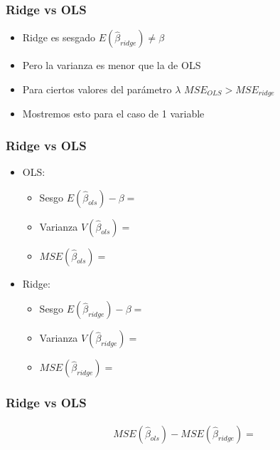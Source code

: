 \documentclass[
  shownotes,
  xcolor={svgnames},
  hyperref={colorlinks,citecolor=DarkBlue,linkcolor=andesred,urlcolor=DarkBlue}
  , aspectratio=169]{beamer}
\begin{document}
\begin{frame}[fragile]
\frametitle{Ridge vs OLS}
 
\bigskip
\begin{itemize}
  \item Ridge es sesgado $E(\hat{\beta}_{ridge}) \neq \beta$
  \medskip
  \item Pero la varianza es menor que la de OLS
  \medskip
  \item Para ciertos valores del parámetro $\lambda$ $MSE_{OLS}>MSE_{ridge}$
  \medskip
  \item Mostremos esto para el caso de 1 variable
\end{itemize}

\end{frame}
\begin{frame}[fragile]
\frametitle{Ridge vs OLS}

\begin{itemize}
    \item OLS:
    \begin{itemize}
        \item Sesgo $E(\hat{\beta}_{ols})-\beta=$
        \medskip
        \item Varianza $V(\hat{\beta}_{ols})=$
        \medskip
        \item $MSE(\hat{\beta}_{ols})=$
    \end{itemize}
    \bigskip
\item Ridge:
    \begin{itemize}
        \item Sesgo $E(\hat{\beta}_{ridge})-\beta=$
        \medskip
        \item Varianza $V(\hat{\beta}_{ridge})=$
        \medskip
        \item $MSE(\hat{\beta}_{ridge})=$
    \end{itemize}
\end{itemize}

\end{frame}


\begin{frame}[t]
\frametitle{Ridge vs OLS}
\begin{align}
MSE(\hat{\beta}_{ols})-MSE(\hat{\beta}_{ridge})=
\end{align}


\end{frame}
\end{document}
